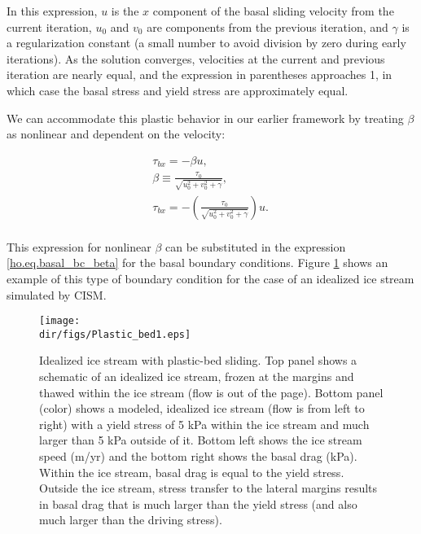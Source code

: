 In this expression, $u$ is the $x$ component of the basal sliding velocity from the current iteration, $u_0$ and $v_0$ are components from the previous iteration, and $\gamma$ is a regularization constant (a small number to avoid division by zero during early iterations). As the solution converges, velocities at the current and previous iteration are nearly equal, and the expression in parentheses approaches 1, in which case the basal stress and yield stress are approximately equal. 

We can accommodate this plastic behavior in our earlier framework by treating $\beta$ as nonlinear and dependent on the velocity:

\begin{equation}
\begin{split}
  & \tau _{bx}=-\beta u,\quad \quad  \\ 
 & \beta \equiv \frac{\tau _{0}}{\sqrt{u_{0}^{2}+v_{0}^{2}+\gamma }},\quad  \\ 
 & \tau _{bx}=-\left( \frac{\tau _{0}}{\sqrt{u_{0}^{2}+v_{0}^{2}+\gamma }} \right)u.\quad  \\
\end{split}
\end{equation}

\noindent
This expression for nonlinear \textit{{\large \(\beta{}\)}} can be substituted in the expression \eqref{ho.eq.basal_bc_beta} for the basal boundary conditions.
Figure \ref{fig:plasticbed1} shows an example of this type of boundary condition for the case of an idealized ice stream simulated by CISM.

\begin{figure}
  \begin{center}
    \texttt{[image: \\dir/figs/Plastic\_bed1.eps]}
  \end{center}
  \caption{Idealized ice stream with plastic-bed sliding. Top panel shows a schematic of an idealized ice stream, frozen at the margins and thawed within the ice stream (flow is out of the page). Bottom panel (color) shows a modeled, idealized ice stream (flow is from left to right) with a yield stress of 5 kPa within the ice stream and much larger than 5 kPa outside of it. Bottom left shows the ice stream speed (m/yr) and the bottom right shows the basal drag (kPa). Within the ice stream, basal drag is equal to the yield stress. Outside the ice stream, stress transfer to the lateral margins results in basal drag that is much larger than the yield stress (and also much larger than the driving stress).}
  \label{fig:plasticbed1}
\end{figure} 

